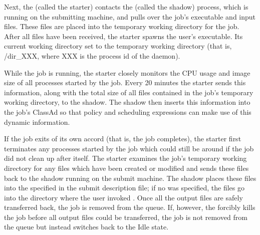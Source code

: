 Next, the  (called the starter) contacts the
 (called the shadow) process, which is running on the
submitting machine, and pulls over the job's executable and input
files.  These files are placed into the temporary working directory
for the job.  After all files have been received, the starter spawns
the user's executable.  Its current working directory set to the
temporary working directory (that is, /dir\_XXX,
where XXX is the process id of the  daemon).

While the job is running, the starter closely monitors the CPU
usage and image size of all processes started by the job.
Every 20 minutes the starter sends this information,
along with the total size of all files contained in the job's
temporary working directory, to the shadow.
The shadow then
inserts this information into the job's ClassAd so that policy and
scheduling expressions can make use of this dynamic information.

If the job exits of its own accord (that is, the job completes),
the starter
first terminates any processes started by the job which could still be
around if the job did not clean up after itself.
The starter examines the job's temporary working directory for any
files which have been created or modified and sends these files back
to the shadow running on the submit machine.
The shadow
places these files into the  specified in the
submit description file; if no  was specified, the files go
into the directory where the user invoked .
Once all the output files are safely transferred back,
the job is removed from the queue.
If, however, the  forcibly kills the job before all output files
could be transferred, the job is not removed from the queue but instead
switches back to the Idle state.  

